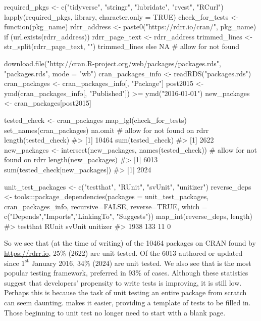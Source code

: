 \begin{example}
required_pkgs <- c("tidyverse", "stringr", "lubridate", "rvest", "RCurl")
lapply(required_pkgs, library, character.only = TRUE)
check_for_tests <- function(pkg_name) {
  rdrr_address <- paste0("https://rdrr.io/cran/", pkg_name)
  if (url.exists(rdrr_address)) {
    rdrr_page_text <- rdrr_address %
    trimmed_lines <- str_split(rdrr_page_text, "\n") %
    trimmed_lines %
  } else {
    NA  # allow for not found
  }
}

download.file("http://cran.R-project.org/web/packages/packages.rds",
              "packages.rds", mode = "wb")
cran_packages_info <- readRDS("packages.rds")
cran_packages <- cran_packages_info[, "Package"]
post2015 <- ymd(cran_packages_info[, "Published"]) >= ymd("2016-01-01")
new_packages <- cran_packages[post2015]

tested_check <- cran_packages %
map_lgl(check_for_tests) %
set_names(cran_packages) %
na.omit  # allow for not found on rdrr
length(tested_check)
#> [1] 10464
sum(tested_check)
#> [1] 2622
new_packages <- intersect(new_packages, 
                          names(tested_check))  # allow for not found on rdrr
length(new_packages)
#> [1] 6013
sum(tested_check[new_packages])
#> [1] 2024

unit_test_packages <- c("testthat", "RUnit", "svUnit", "unitizer")
reverse_deps <- tools:::package_dependencies(packages = unit_test_packages,
                          cran_packages_info, recursive=FALSE, reverse=TRUE,
                          which = c("Depends","Imports","LinkingTo", "Suggests"))
map_int(reverse_deps, length)
#> testthat    RUnit   svUnit unitizer 
#>     1938      133       11        0
\end{example}
So we see that (at the time of writing) of the 10464 packages on CRAN found by \url{https://rdrr.io}, 25\% (2622) are unit tested. Of the 6013 authored or updated since $1^\text{st}$ January 2016, 34\% (2024) are unit tested. We also see that  is the most popular testing framework, preferred in 93\% of cases.
Although these statistics suggest that developers' propensity to write tests is improving, it is still low. Perhaps this is because the task of unit testing an entire package from scratch can seem daunting. 
 makes it easier, providing a template of tests to be filled in. Those beginning to unit test no longer need to start with a blank page.

